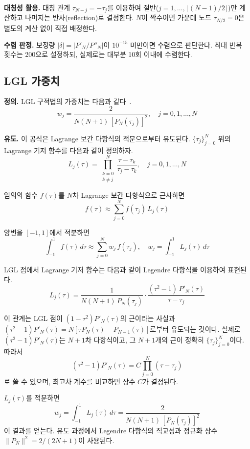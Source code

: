 \documentclass[11pt]{article}
\begin{document}
\textbf{대칭성 활용.} 대칭 관계 $\tau_{N-j} = -\tau_j$를 이용하여 절반($j = 1, \ldots, \lfloor(N-1)/2\rfloor$)만 계산하고 나머지는 반사(reflection)로 결정한다. $N$이 짝수이면 가운데 노드 $\tau_{N/2} = 0$은 별도의 계산 없이 직접 배정한다.

\textbf{수렴 판정.} 보정량 $|\delta| = |P'_N / P''_N|$이 $10^{-15}$ 미만이면 수렴으로 판단한다. 최대 반복 횟수는 200으로 설정하되, 실제로는 대부분 10회 이내에 수렴한다.

\subsection{LGL 가중치}
\label{sec:weights}

\textbf{정의.} LGL 구적법의 가중치는 다음과 같다~\cite{Canuto2006}.
\begin{equation}
\label{eq:weights}
w_j = \frac{2}{N(N+1)\, [P_N(\tau_j)]^2}, \quad j = 0, 1, \ldots, N
\end{equation}

\textbf{유도.} 이 공식은 Lagrange 보간 다항식의 적분으로부터 유도된다. $\{\tau_j\}_{j=0}^{N}$ 위의 Lagrange 기저 함수를 다음과 같이 정의하자.
\[
L_j(\tau) = \prod_{\substack{k=0 \\ k \neq j}}^{N} \frac{\tau - \tau_k}{\tau_j - \tau_k}, \quad j = 0, 1, \ldots, N
\]

임의의 함수 $f(\tau)$를 $N$차 Lagrange 보간 다항식으로 근사하면
\[
f(\tau) \approx \sum_{j=0}^{N} f(\tau_j)\, L_j(\tau)
\]

양변을 $[-1, 1]$에서 적분하면
\[
\int_{-1}^{1} f(\tau)\, d\tau \approx \sum_{j=0}^{N} w_j\, f(\tau_j), \quad w_j = \int_{-1}^{1} L_j(\tau)\, d\tau
\]

LGL 점에서 Lagrange 기저 함수는 다음과 같이 Legendre 다항식을 이용하여 표현된다.
\[
L_j(\tau) = \frac{1}{N(N+1)\, P_N(\tau_j)} \cdot \frac{(\tau^2 - 1)\, P'_N(\tau)}{\tau - \tau_j}
\]

이 관계는 LGL 점이 $(1 - \tau^2) P'_N(\tau)$의 근이라는 사실과 $(\tau^2 - 1) P'_N(\tau) = N[\tau P_N(\tau) - P_{N-1}(\tau)]$로부터 유도되는 것이다. 실제로 $(\tau^2 - 1) P'_N(\tau)$는 $N+1$차 다항식이고, 그 $N+1$개의 근이 정확히 $\{\tau_j\}_{j=0}^N$이다. 따라서
\[
(\tau^2 - 1) P'_N(\tau) = C \prod_{j=0}^{N} (\tau - \tau_j)
\]
로 쓸 수 있으며, 최고차 계수를 비교하면 상수 $C$가 결정된다.

$L_j(\tau)$를 적분하면
\[
w_j = \int_{-1}^{1} L_j(\tau)\, d\tau = \frac{2}{N(N+1)\, [P_N(\tau_j)]^2}
\]
이 결과를 얻는다. 유도 과정에서 Legendre 다항식의 직교성과 정규화 상수 $\|P_N\|^2 = 2/(2N+1)$이 사용된다.
\end{document}
